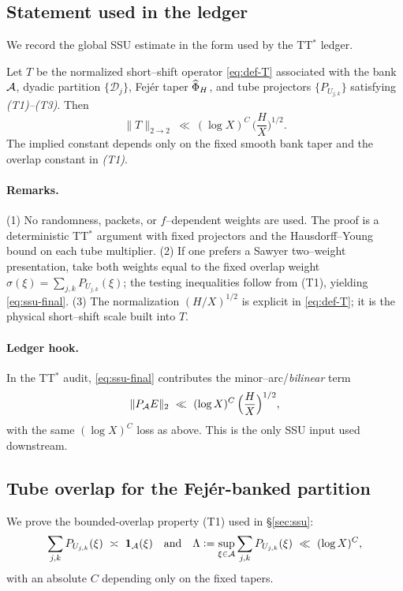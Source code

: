 \subsection{Statement used in the ledger}
We record the global SSU estimate in the form used by the TT$^\ast$ ledger.

\begin{theorem}\label{thm:BG-repaired}
Let $T$ be the normalized short–shift operator \eqref{eq:def-T} associated with the bank $\mathcal{A}$, dyadic
partition $\{\mathcal D_j\}$, Fejér taper $\widehat\Phi_H$, and tube projectors $\{P_{U_{j,k}}\}$ satisfying \emph{(T1)–(T3)}.
Then
\begin{equation}\label{eq:ssu-final}
\|T\|_{2\to2}\ \ll\ (\log X)^C\,\Big(\frac{H}{X}\Big)^{\!1/2}.
\end{equation}
The implied constant depends only on the fixed smooth bank taper and the overlap constant in \emph{(T1)}.
\end{theorem}

\paragraph*{Remarks.}
(1) No randomness, packets, or $f$–dependent weights are used. The proof is a deterministic TT$^\ast$ argument with fixed projectors and the Hausdorff–Young bound on each tube multiplier.  
(2) If one prefers a Sawyer two–weight presentation, take both weights equal to the fixed overlap weight
$\sigma(\xi)=\sum_{j,k} P_{U_{j,k}}(\xi)$; the testing inequalities follow from (T1), yielding \eqref{eq:ssu-final}.  
(3) The normalization $(H/X)^{1/2}$ is explicit in \eqref{eq:def-T}; it is the physical short–shift scale built into $T$.

\paragraph*{Ledger hook.}
In the TT$^\ast$ audit, \eqref{eq:ssu-final} contributes the minor–arc/\emph{bilinear} term
\[
\|P_{\mathcal{A}}E\|_2\ \ll\ (\log X)^C\,\Big(\frac{H}{X}\Big)^{1/2},
\]
with the same $(\log X)^C$ loss as above. This is the only SSU input used downstream.



\subsection{Tube overlap for the Fejér-banked partition}

We prove the bounded-overlap property (T1) used in §\ref{sec:ssu}:
\[
\sum_{j,k} P_{U_{j,k}}(\xi)\ \asymp\ \mathbf 1_{\mathcal{A}}(\xi)
\quad\text{and}\quad
\Lambda:=\sup_{\xi\in\mathcal{A}}\sum_{j,k} P_{U_{j,k}}(\xi)\ \ll\ (\log X)^C,
\]
with an absolute $C$ depending only on the fixed tapers.

